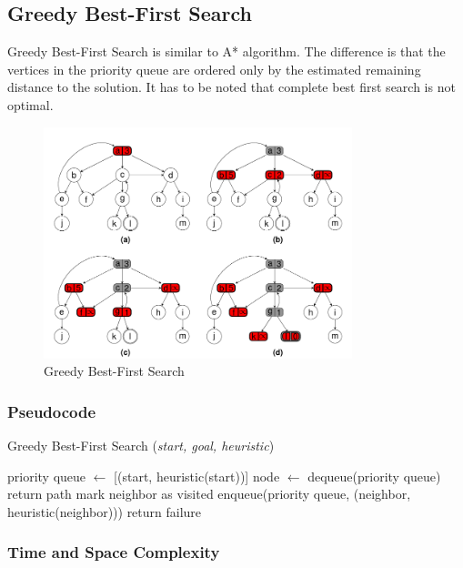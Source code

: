 \subsection{Greedy Best-First Search}
\noindent Greedy Best-First Search is similar to A* algorithm. The difference is that the vertices in the priority queue are ordered only by the estimated remaining distance to the solution. It has to be noted that complete best first search is not optimal.

\begin{figure}
	\centering
	\includegraphics[width=0.8\textwidth]{./imgs/gbfs.png}
	\caption{Greedy Best-First Search}
	\label{fig:GBFS}
\end{figure}

\subsubsection{Pseudocode}
\begin{algorithm}[H]
	\caption{Greedy Best-First Search (\textit{start, goal, heuristic})}
	\label{alg:gbfs}
	\begin{algorithmic}[1]
	\State priority queue $\gets$ [(start, heuristic(start))]
		\State node $\gets$ dequeue(priority queue)
			\State return path
		\EndIf
				\State mark neighbor as visited
				\State enqueue(priority queue, (neighbor, heuristic(neighbor)))
			\EndIf
		\EndFor
	\EndWhile
	\State return failure
	\end{algorithmic}
\end{algorithm}

\subsubsection{Time and Space Complexity}
